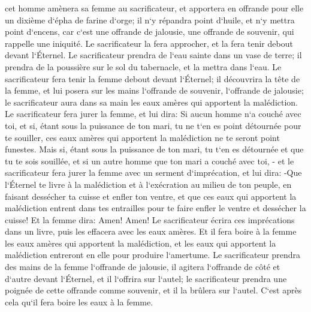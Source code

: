 \verse cet homme amènera sa femme au sacrificateur, et apportera en offrande pour elle un dixième d`épha de farine d`orge; il n`y répandra point d`huile, et n`y mettra point d`encens, car c`est une offrande de jalousie, une offrande de souvenir, qui rappelle une iniquité. 
\verse Le sacrificateur la fera approcher, et la fera tenir debout devant l`Éternel. 
\verse Le sacrificateur prendra de l`eau sainte dans un vase de terre; il prendra de la poussière sur le sol du tabernacle, et la mettra dans l`eau. 
\verse Le sacrificateur fera tenir la femme debout devant l`Éternel; il découvrira la tête de la femme, et lui posera sur les mains l`offrande de souvenir, l`offrande de jalousie; le sacrificateur aura dans sa main les eaux amères qui apportent la malédiction. 
\verse Le sacrificateur fera jurer la femme, et lui dira: Si aucun homme n`a couché avec toi, et si, étant sous la puissance de ton mari, tu ne t`en es point détournée pour te souiller, ces eaux amères qui apportent la malédiction ne te seront point funestes. 
\verse Mais si, étant sous la puissance de ton mari, tu t`en es détournée et que tu te sois souillée, et si un autre homme que ton mari a couché avec toi, - 
\verse et le sacrificateur fera jurer la femme avec un serment d`imprécation, et lui dira: -Que l`Éternel te livre à la malédiction et à l`exécration au milieu de ton peuple, en faisant dessécher ta cuisse et enfler ton ventre, 
\verse et que ces eaux qui apportent la malédiction entrent dans tes entrailles pour te faire enfler le ventre et dessécher la cuisse! Et la femme dira: Amen! Amen! 
\verse Le sacrificateur écrira ces imprécations dans un livre, puis les effacera avec les eaux amères. 
\verse Et il fera boire à la femme les eaux amères qui apportent la malédiction, et les eaux qui apportent la malédiction entreront en elle pour produire l`amertume. 
\verse Le sacrificateur prendra des mains de la femme l`offrande de jalousie, il agitera l`offrande de côté et d`autre devant l`Éternel, et il l`offrira sur l`autel; 
\verse le sacrificateur prendra une poignée de cette offrande comme souvenir, et il la brûlera sur l`autel. C`est après cela qu`il fera boire les eaux à la femme. 
